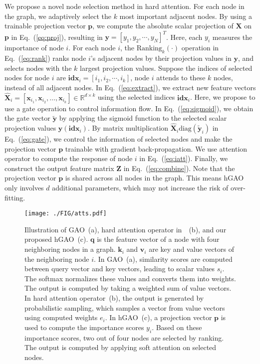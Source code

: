 \documentclass[sigconf]{acmart}
\begin{document}
We propose a novel node selection method in hard attention. For each
node in the graph, we adaptively select the $k$ most important
adjacent nodes. By using a trainable projection vector $\boldsymbol
p$, we compute the absolute scalar projection of $\boldsymbol X$ on
$\boldsymbol p$ in Eq.~(\ref{eq:proj}), resulting in $\boldsymbol y
= [y_1, y_2, \cdots, y_N]^T$. Here, each $y_i$ measures the
importance of node $i$. For each node $i$, the
$\mbox{Ranking}_k(\cdot)$ operation in Eq.~(\ref{eq:rank}) ranks
node $i$'s adjacent nodes by their projection values in $\boldsymbol
y$, and selects nodes with the $k$ largest projection values.
Suppose the indices of selected nodes for node $i$ are
$\boldsymbol{idx}_i = [i_1, i_2, \cdots, i_k]$, node $i$ attends to
these $k$ nodes, instead of all adjacent nodes. In
Eq.~(\ref{eq:extract}), we extract new feature vectors
$\boldsymbol{\hat X}_i = [\boldsymbol x_{i_1}, \boldsymbol{x}_{i_2},
\ldots, \boldsymbol{x}_{i_k}] \in \mathbb{R}^{d\times k}$ using the
selected indices $\boldsymbol{idx}_i$. Here, we propose to use a
gate operation to control information flow. In
Eq.~(\ref{eq:sigmoid}), we obtain the gate vector
$\boldsymbol{\tilde y}$ by applying the sigmoid function to the
selected scalar projection values $\boldsymbol
y(\boldsymbol{idx}_i)$. By matrix multiplication $\boldsymbol{\hat
X}_i \mbox{diag}(\boldsymbol{\tilde y}_i)$ in Eq.~(\ref{eq:gate}),
we control the information of selected nodes and make the projection
vector $\boldsymbol p$ trainable with gradient back-propagation. We
use attention operator to compute the response of node $i$ in
Eq.~(\ref{eq:iatt}). Finally, we construct the output feature matrix
$\boldsymbol Z$ in Eq.~(\ref{eq:combine}). Note that the projection
vector $\boldsymbol p$ is shared across all nodes in the graph. This
means hGAO only involves $d$ additional parameters, which may not
increase the risk of over-fitting.

\begin{figure*}[t] \texttt{[image: ./FIG/atts.pdf]}
\caption{Illustration of GAO~(a), hard attention operator
in~\cite{xu2015show}~(b), and our proposed hGAO~(c). $\boldsymbol q$
is the feature vector of a node with four neighboring nodes in a
graph. $\boldsymbol k_i$ and $\boldsymbol v_i$ are key and value
vectors of the neighboring node $i$. In GAO~(a), similarity scores
are computed between query vector and key vectors, leading to scalar
values $s_i$. The softmax normalizes these values and converts them
into weights. The output is computed by taking a weighted sum of
value vectors. In hard attention operator~(b), the output is
generated by probabilistic sampling, which samples a vector from
value vectors using computed weights $e_i$. In hGAO~(c), a projection
vector $\boldsymbol p$ is used to compute the importance scores
$y_i$. Based on these importance scores, two out of four nodes are
selected by ranking. The output is computed by applying soft
attention on selected nodes.} \label{fig:atts}
\end{figure*}
\end{document}
